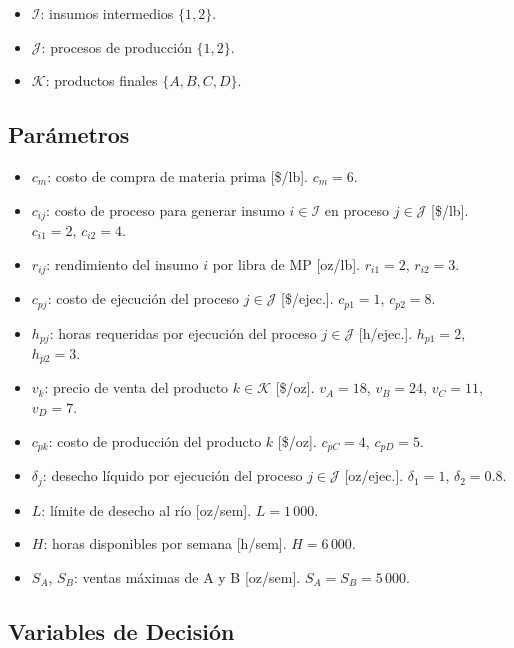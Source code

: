 \documentclass[12pt,a4paper]{article}
\begin{document}
\begin{conjbox}
\begin{itemize}[leftmargin=1.5em]
  \item $\mathcal{I}$: insumos intermedios $\{1, 2\}$.
  \item $\mathcal{J}$: procesos de producción $\{1, 2\}$.
  \item $\mathcal{K}$: productos finales $\{A, B, C, D\}$.
\end{itemize}
\end{conjbox}

\subsection{Parámetros}

\begin{parambox}
\begin{itemize}[leftmargin=1.5em]
  \item $c_m$: costo de compra de materia prima [\$/lb]. $c_m = 6$.
  \item $c_{ij}$: costo de proceso para generar insumo $i \in \mathcal{I}$ en proceso $j \in \mathcal{J}$ [\$/lb]. $c_{i1}=2$, $c_{i2}=4$.
  \item $r_{ij}$: rendimiento del insumo $i$ por libra de MP [oz/lb]. $r_{i1}=2$, $r_{i2}=3$.
  \item $c_{pj}$: costo de ejecución del proceso $j \in \mathcal{J}$ [\$/ejec.]. $c_{p1}=1$, $c_{p2}=8$.
  \item $h_{pj}$: horas requeridas por ejecución del proceso $j \in \mathcal{J}$ [h/ejec.]. $h_{p1}=2$, $h_{p2}=3$.
  \item $v_k$: precio de venta del producto $k \in \mathcal{K}$ [\$/oz]. $v_A=18$, $v_B=24$, $v_C=11$, $v_D=7$.
  \item $c_{pk}$: costo de producción del producto $k$ [\$/oz]. $c_{pC}=4$, $c_{pD}=5$.
  \item $\delta_j$: desecho líquido por ejecución del proceso $j \in \mathcal{J}$ [oz/ejec.]. $\delta_1=1$, $\delta_2=0.8$.
  \item $L$: límite de desecho al río [oz/sem]. $L = 1\,000$.
  \item $H$: horas disponibles por semana [h/sem]. $H = 6\,000$.
  \item $S_A$, $S_B$: ventas máximas de A y B [oz/sem]. $S_A = S_B = 5\,000$.
\end{itemize}
\end{parambox}

\subsection{Variables de Decisión}
\end{document}
